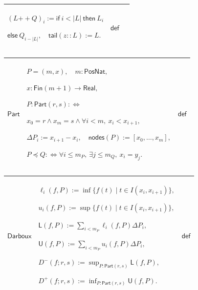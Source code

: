 \documentclass[11pt]{amsart}
\newlength{\FTCThreeColumnBody}
\begin{document}
{\begin{tabular}{|@{}>{\centering\arraybackslash}m{0.251968\FTCThreeColumnBody}|>{\centering\arraybackslash}m{0.590551\FTCThreeColumnBody}|>{\centering\arraybackslash}m{0.157480\FTCThreeColumnBody}|}
$\displaystyle (L\mathbin{+\!\!+}Q)_i:=\textsf{if}\ i<|L|\ \textsf{then}\ L_i$\par
$\displaystyle \textsf{else}\ Q_{i-|L|},\quad\textsf{tail}(z::L):=L.$ & $\displaystyle \textsf{def}$\\ \hline
\end{tabular}%
\par\setlength{\parskip}{0pt}\nointerlineskip
\noindent
\begin{tabular}{|@{}>{\centering\arraybackslash}m{0.251968\FTCThreeColumnBody}|>{\centering\arraybackslash}m{0.590551\FTCThreeColumnBody}|>{\centering\arraybackslash}m{0.157480\FTCThreeColumnBody}|}\hline
\hypertarget{def:Part}{$\displaystyle \textsf{Part}$} & $\displaystyle P=(m,x),\quad m:\textsf{PosNat},$\par
$\displaystyle x:\textsf{Fin}(m+1)\to\textsf{Real},$\par
$\displaystyle P:\textsf{Part}(r,s):\Longleftrightarrow$\par
$\displaystyle x_0=r\land x_m=s\land\forall i<m,\ x_i<x_{i+1},$\par
$\displaystyle \Delta P_i:=x_{i+1}-x_i,\quad\textsf{nodes}(P):=[x_0,\ldots,x_m],$\par
$\displaystyle P\preceq Q:\Longleftrightarrow\forall i\le m_P,\ \exists j\le m_Q,\ x_i=y_j.$ & $\displaystyle \textsf{def}$\\ \hline
\end{tabular}%
\par\setlength{\parskip}{0pt}\nointerlineskip
\noindent
\begin{tabular}{|@{}>{\centering\arraybackslash}m{0.251968\FTCThreeColumnBody}|>{\centering\arraybackslash}m{0.590551\FTCThreeColumnBody}|>{\centering\arraybackslash}m{0.157480\FTCThreeColumnBody}|}\hline
\hypertarget{def:Darboux}{$\displaystyle \textsf{Darboux}$} & $\displaystyle \ell_i(f,P):=\inf\{f(t)\mid t\in I(x_i,x_{i+1})\},$\par
$\displaystyle u_i(f,P):=\sup\{f(t)\mid t\in I(x_i,x_{i+1})\},$\par
$\displaystyle \textsf{L}(f,P):=\sum_{i<m_P}\ell_i(f,P)\Delta P_i,$\par
$\displaystyle \textsf{U}(f,P):=\sum_{i<m_P}u_i(f,P)\Delta P_i,$\par
$\displaystyle D^-(f;r,s):=\sup_{P:\textsf{Part}(r,s)}\textsf{L}(f,P),$\par
$\displaystyle D^+(f;r,s):=\inf_{P:\textsf{Part}(r,s)}\textsf{U}(f,P).$ & $\displaystyle \textsf{def}$\\ \hline
\end{tabular}%
}
\end{document}
